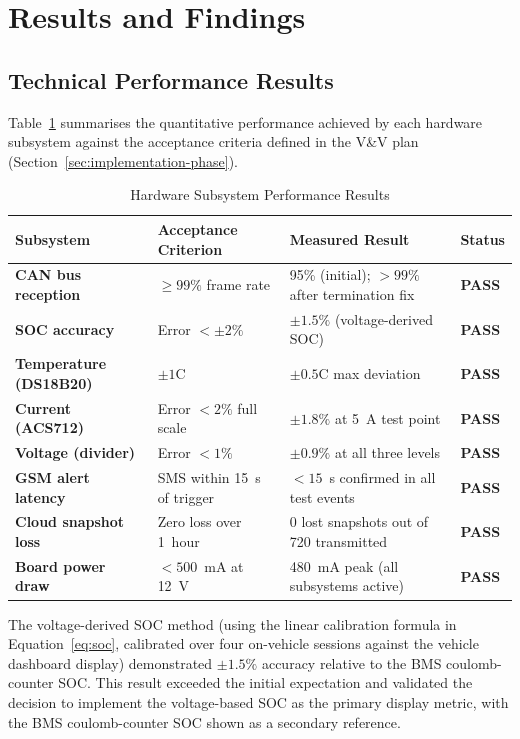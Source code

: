 \section{Results and Findings}
\label{sec:results-findings}

\subsection{Technical Performance Results}

Table~\ref{tab:technical-results} summarises the quantitative performance achieved by each hardware subsystem against the acceptance criteria defined in the V\&V plan (Section~\ref{sec:implementation-phase}).

\begin{table}[H]
\centering
\caption{Hardware Subsystem Performance Results}
\label{tab:technical-results}
\small
\begin{tabular}{>{\bfseries}p{3.2cm} p{3.2cm} p{3.2cm} p{2.0cm}}
\toprule
Subsystem & Acceptance Criterion & Measured Result & Status \\
\midrule
CAN bus reception  & $\geq 99\%$ frame rate       & 95\% (initial); $>99\%$ after termination fix & \textbf{PASS} \\
SOC accuracy       & Error $< \pm 2\%$            & $\pm 1.5\%$ (voltage-derived SOC)             & \textbf{PASS} \\
Temperature (DS18B20) & $\pm 1$\textdegree{}C     & $\pm 0.5$\textdegree{}C max deviation         & \textbf{PASS} \\
Current (ACS712)   & Error $< 2\%$ full scale     & $\pm 1.8\%$ at 5~A test point                 & \textbf{PASS} \\
Voltage (divider)  & Error $< 1\%$                & $\pm 0.9\%$ at all three levels               & \textbf{PASS} \\
GSM alert latency  & SMS within 15~s of trigger   & $< 15$~s confirmed in all test events         & \textbf{PASS} \\
Cloud snapshot loss & Zero loss over 1~hour        & 0 lost snapshots out of 720 transmitted        & \textbf{PASS} \\
Board power draw   & $< 500$~mA at 12~V           & 480~mA peak (all subsystems active)            & \textbf{PASS} \\
\bottomrule
\end{tabular}
\end{table}

The voltage-derived SOC method (using the linear calibration formula in Equation~\ref{eq:soc}, calibrated over four on-vehicle sessions against the vehicle dashboard display) demonstrated $\pm 1.5\%$ accuracy relative to the BMS coulomb-counter SOC. This result exceeded the initial expectation and validated the decision to implement the voltage-based SOC as the primary display metric, with the BMS coulomb-counter SOC shown as a secondary reference.

